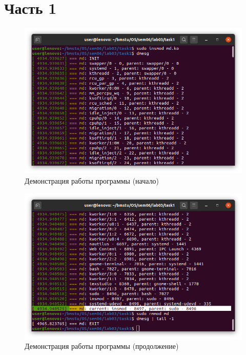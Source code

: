 \documentclass[a4paper,oneside,12pt]{extreport}
\begin{document}


\section*{Часть 1}



\begin{figure}[H]
	\centering
	\includegraphics[width=\linewidth]{inc/img/task1-1}
	\caption{Демонстрация работы программы (начало)}
	\label{img:task1-1}
\end{figure}

\begin{figure}[H]
	\centering
	\includegraphics[width=\linewidth]{inc/img/task1-2}
	\caption{Демонстрация работы программы (продолжение)}
	\label{img:task1-2}
\end{figure}
\end{document}
